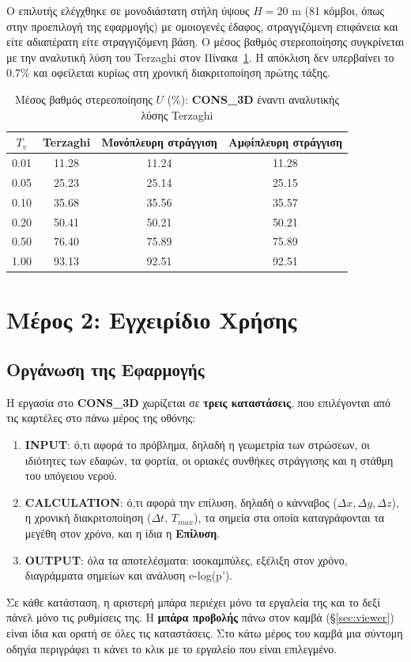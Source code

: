 \documentclass[11pt,a4paper]{article}
\newcommand{\cons}{\textbf{CONS\_3D}}
\begin{document}
Ο επιλυτής ελέγχθηκε σε μονοδιάστατη στήλη ύψους $H = 20$ m (81 κόμβοι, όπως στην προεπιλογή της εφαρμογής) με ομοιογενές έδαφος, στραγγιζόμενη επιφάνεια και είτε αδιαπέρατη είτε στραγγιζόμενη βάση. Ο μέσος βαθμός στερεοποίησης συγκρίνεται με την αναλυτική λύση του Terzaghi στον Πίνακα~\ref{tab:terzaghi}. Η απόκλιση δεν υπερβαίνει το $0.7\%$ και οφείλεται κυρίως στη χρονική διακριτοποίηση πρώτης τάξης.

\begin{table}[H]
  \centering
  \caption{Μέσος βαθμός στερεοποίησης $U$ (\%): \cons{} έναντι αναλυτικής λύσης Terzaghi}\label{tab:terzaghi}
  \begin{tabular}{cccc}
    \toprule
    \textbf{$T_v$} & \textbf{Terzaghi} & \textbf{Μονόπλευρη στράγγιση} & \textbf{Αμφίπλευρη στράγγιση} \\
    \midrule
    0.01 & 11.28 & 11.24 & 11.28 \\
    0.05 & 25.23 & 25.14 & 25.15 \\
    0.10 & 35.68 & 35.56 & 35.57 \\
    0.20 & 50.41 & 50.21 & 50.21 \\
    0.50 & 76.40 & 75.89 & 75.89 \\
    1.00 & 93.13 & 92.51 & 92.51 \\
    \bottomrule
  \end{tabular}
\end{table}

\section{Μέρος 2: Εγχειρίδιο Χρήσης}

\subsection{Οργάνωση της Εφαρμογής}

Η εργασία στο \cons{} χωρίζεται σε \textbf{τρεις καταστάσεις}, που επιλέγονται από τις καρτέλες στο πάνω μέρος της οθόνης:
\begin{enumerate}
  \item \textbf{INPUT}: ό,τι αφορά το πρόβλημα, δηλαδή η γεωμετρία των στρώσεων, οι ιδιότητες των εδαφών, τα φορτία, οι οριακές συνθήκες στράγγισης και η στάθμη του υπόγειου νερού.
  \item \textbf{CALCULATION}: ό,τι αφορά την επίλυση, δηλαδή ο κάνναβος ($\Delta x, \Delta y, \Delta z$), η χρονική διακριτοποίηση ($\Delta t$, $T_{max}$), τα σημεία στα οποία καταγράφονται τα μεγέθη στον χρόνο, και η ίδια η \textbf{Επίλυση}.
  \item \textbf{OUTPUT}: όλα τα αποτελέσματα: ισοκαμπύλες, εξέλιξη στον χρόνο, διαγράμματα σημείων και ανάλυση e-log(p').
\end{enumerate}
Σε κάθε κατάσταση, η αριστερή μπάρα περιέχει μόνο τα εργαλεία της και το δεξί πάνελ μόνο τις ρυθμίσεις της. Η \textbf{μπάρα προβολής} πάνω στον καμβά (§\ref{sec:viewer}) είναι ίδια και ορατή σε όλες τις καταστάσεις. Στο κάτω μέρος του καμβά μια σύντομη οδηγία περιγράφει τι κάνει το κλικ με το εργαλείο που είναι επιλεγμένο.
\end{document}
